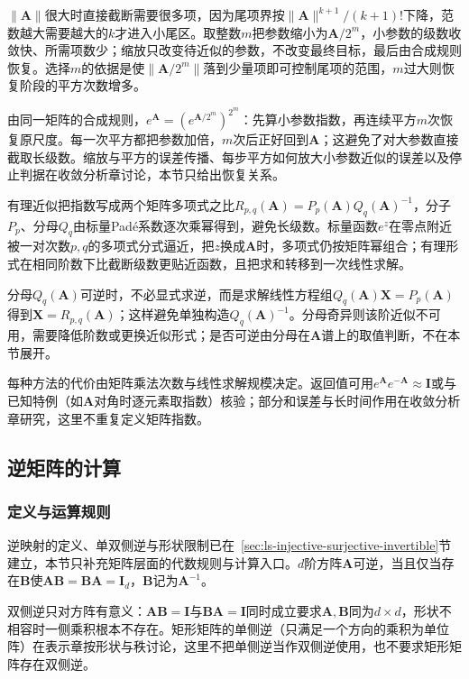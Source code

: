 $\lVert\bm A\rVert$很大时直接截断需要很多项，因为尾项界按$\lVert\bm A\rVert^{k+1}/(k+1)!$下降，范数越大需要越大的$k$才进入小尾区。取整数$m$把参数缩小为$\bm A/2^m$，小参数的级数收敛快、所需项数少；缩放只改变待近似的参数，不改变最终目标，最后由合成规则恢复。选择$m$的依据是使$\lVert\bm A/2^m\rVert$落到少量项即可控制尾项的范围，$m$过大则恢复阶段的平方次数增多。

由同一矩阵的合成规则，$e^{\bm A}=(e^{\bm A/2^m})^{2^m}$：先算小参数指数，再连续平方$m$次恢复原尺度。每一次平方都把参数加倍，$m$次后正好回到$\bm A$；这避免了对大参数直接截取长级数。缩放与平方的误差传播、每步平方如何放大小参数近似的误差以及停止判据在收敛分析章讨论，本节只给出恢复关系。

有理近似把指数写成两个矩阵多项式之比$R_{p,q}(\bm A)=P_p(\bm A)Q_q(\bm A)^{-1}$，分子$P_p$、分母$Q_q$由标量Padé系数逐次乘幂得到，避免长级数。标量函数$e^z$在零点附近被一对次数$p,q$的多项式分式逼近，把$z$换成$\bm A$时，多项式仍按矩阵幂组合；有理形式在相同阶数下比截断级数更贴近函数，且把求和转移到一次线性求解。

分母$Q_q(\bm A)$可逆时，不必显式求逆，而是求解线性方程组$Q_q(\bm A)\bm X=P_p(\bm A)$得到$\bm X=R_{p,q}(\bm A)$；这样避免单独构造$Q_q(\bm A)^{-1}$。分母奇异则该阶近似不可用，需要降低阶数或更换近似形式；是否可逆由分母在$\bm A$谱上的取值判断，不在本节展开。

每种方法的代价由矩阵乘法次数与线性求解规模决定。返回值可用$e^{\bm A}e^{-\bm A}\approx\bm I$或与已知特例（如$\bm A$对角时逐元素取指数）核验；部分和误差与长时间作用在收敛分析章研究，这里不重复定义矩阵指数。

\subsection{逆矩阵的计算}

\subsubsection{定义与运算规则}

逆映射的定义、单双侧逆与形状限制已在~\ref{sec:ls-injective-surjective-invertible}节建立，本节只补充矩阵层面的代数规则与计算入口。$d$阶方阵$\bm A$可逆，当且仅当存在$\bm B$使$\bm A\bm B=\bm B\bm A=\bm I_d$，$\bm B$记为$\bm A^{-1}$。

双侧逆只对方阵有意义：$\bm A\bm B=\bm I$与$\bm B\bm A=\bm I$同时成立要求$\bm A,\bm B$同为$d\times d$，形状不相容时一侧乘积根本不存在。矩形矩阵的单侧逆（只满足一个方向的乘积为单位阵）在表示章按形状与秩讨论，这里不把单侧逆当作双侧逆使用，也不要求矩形矩阵存在双侧逆。

